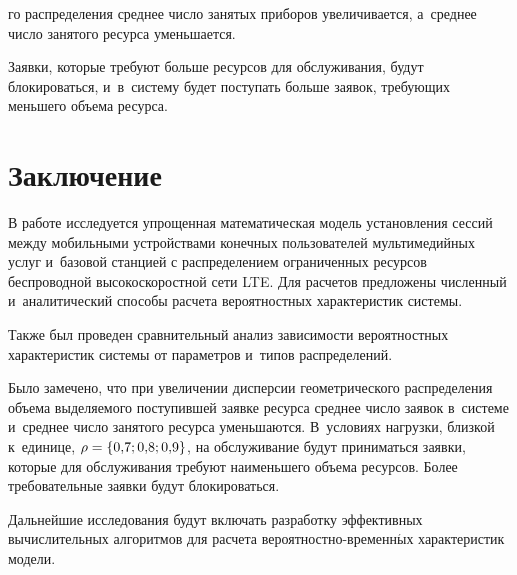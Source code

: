  
 \begin{multicols}{2}

\noindent
го распределения 
среднее число занятых приборов увеличивается, а~среднее число занятого 
ресурса уменьшается. 

Заявки, которые требуют больше ресурсов для 
обслуживания, будут блокироваться, 
и~в~систему будет поступать больше 
заявок, требующих меньшего объема ресурса.

\columnbreak

  

  
\section{Заключение}


    
  В работе исследуется упрощенная математи\-ческая модель установления 
сессий между мо\-биль\-ными устройствами конечных пользователей 
мультимедий\-ных услуг и~базовой станцией с распределением ограниченных 
ресурсов беспроводной высокоскоростной сети LTE. 
%
Для расчетов предложены 
численный и~аналитический способы расчета вероятностных характеристик 
системы. 

Также был проведен сравнительный анализ зависимости 
вероятностных характеристик системы от параметров и~типов распределений. 

Было замечено, что при увеличении дисперсии геометрического распределения 
объема выделя\-емо\-го поступившей заявке ресурса среднее чис\-ло заявок 
в~системе и~среднее число занятого ресур\-са уменьшаются. В~условиях 
нагрузки, близкой к~единице, $\rho\hm= \{0{,}7; 0{,}8; 0{,}9\}$, на 
об\-слу\-жи\-ва\-ние будут приниматься заявки, которые для обслу\-жи\-ва\-ния требуют 
наименьшего объема ресурсов. Более требовательные заявки будут 
бло\-ки\-ро\-ваться. 
{

}
  
  Дальнейшие исследования будут включать разработку эффективных 
вычислительных алгоритмов для расчета ве\-ро\-ят\-ност\-но-вре\-мен\-н$\acute{\mbox{ы}}$х 
характеристик модели.
  
  
{\small\frenchspacing
 {%
 \begin{thebibliography}{9}
 

\end{thebibliography}}}
\end{multicols}
